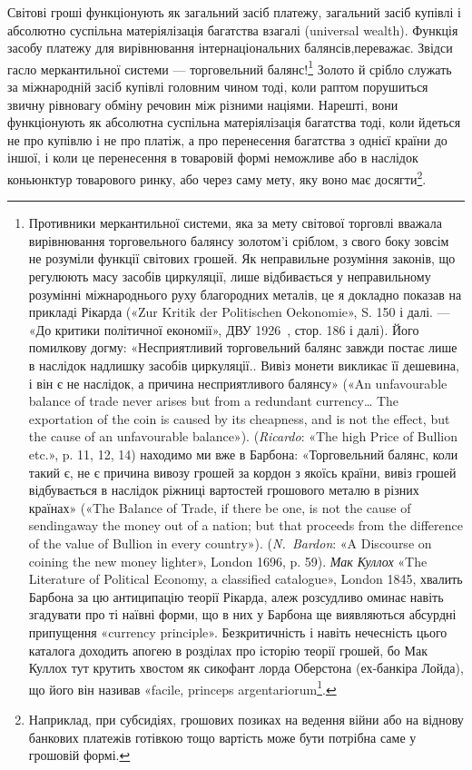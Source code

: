 Світові гроші функціонують як загальний засіб платежу,
загальний засіб купівлі і абсолютно суспільна матеріялізація
багатства взагалі (universal wealth). Функція засобу платежу
для вирівнювання інтернаціональних балянсів,переважає. Звідси
гасло меркантильної системи — торговельний балянс!\footnote{
Противники меркантильної системи, яка за мету світової торговлі
вважала вирівнювання торговельного балянсу золотом'і сріблом, з свого
боку зовсім не розуміли функції світових грошей. Як неправильне розуміння
законів, що регулюють масу засобів циркуляції, лише відбивається
у неправильному розумінні міжнароднього руху благородних металів,
це я докладно показав на прикладі Рікарда («Zur Kritik der Politischen
Oekonomie», S. 150 і далі. — «До критики політичної економії», ДВУ
1926~, стор. 186 і далі). Його помилкову догму: «Несприятливий торговельний
балянс завжди постає лише в наслідок надлишку засобів циркуляції..
Вивіз монети викликає її дешевина, і він є не наслідок, а причина
несприятливого балянсу» («An unfavourable balance of trade never
arises but from a redundant currency\dots{} The exportation of the coin is caused
by its cheapness, and is not the effect, but the cause of an unfavourable
balance»). (\emph{Ricardo}: «The high Price of Bullion etc.», p. 11, 12, 14)
находимо ми вже в Барбона: «Торговельний балянс, коли такий є, не
є причина вивозу грошей за кордон з якоїсь країни, вивіз грошей відбувається
в наслідок ріжниці вартостей грошового металю в різних країнах»
(«The Balance of Trade, if there be one, is not the cause of sendingaway
the money out of a nation; but that proceeds from the difference of the value
of Bullion in every country»). (\emph{N.~Bardon}: «A Discourse on coining
the new money lighter», London 1696, p. 59). \emph{Мак Куллох} «The Literature
of Political Economy, a classified catalogue», London 1845, хвалить
Барбона за цю антиципацію теорії Рікарда, алеж розсудливо оминає
навіть згадувати про ті наївні форми, що в них у Барбона ще виявляються
абсурдні припущення «currency principle». Безкритичність і навіть нечесність
цього каталога доходить апогею в розділах про історію теорії
грошей, бо Мак Куллох тут крутить хвостом як сикофант лорда Оберстона
(ех-банкіра Лойда), що його він називав «facile, princeps argentariorum\footnote*{
— безперечним головою банкірів. \emph{Ред.}
}.
} Золото й срібло служать за міжнародній засіб купівлі головним чином
тоді, коли раптом порушиться звичну рівновагу обміну речовин
між різними націями. Нарешті, вони функціонують як абсолютна
суспільна матеріялізація багатства тоді, коли йдеться не
про купівлю і не про платіж, а про перенесення багатства з однієї
країни до іншої, і коли це перенесення в товаровій формі неможливе
або в наслідок коньюнктур товарового ринку, або через
саму мету, яку воно має досягти\footnote{
Наприклад, при субсидіях, грошових позиках на ведення війни
або на віднову банкових платежів готівкою тощо вартість може бути потрібна
саме у грошовій формі.
}.

